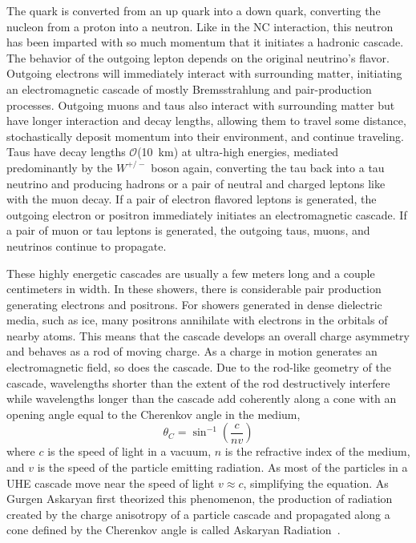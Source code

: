   \noindent The quark is converted from an up quark into a down quark, converting the nucleon from a proton into a neutron. 
  Like in the NC interaction, this neutron has been imparted with so much momentum that it initiates a hadronic cascade. 
  The behavior of the outgoing lepton depends on the original neutrino's flavor. 
  Outgoing electrons will immediately interact with surrounding matter, initiating an electromagnetic cascade of mostly Bremsstrahlung and pair-production processes. 
  Outgoing muons and taus also interact with surrounding matter but have longer interaction and decay lengths, allowing them to travel some distance, stochastically deposit momentum into their environment, and continue traveling. 
  Taus have decay lengths $\mathcal{O}$(10~km) at ultra-high energies, mediated predominantly by the $W^{+/-}$ boson again, converting the tau back into a tau neutrino and producing hadrons or a pair of neutral and charged leptons like with the muon decay.
  If a pair of electron flavored leptons is generated, the outgoing electron or positron immediately initiates an electromagnetic cascade. 
  If a pair of muon or tau leptons is generated, the outgoing taus, muons, and neutrinos continue to propagate.

  These highly energetic cascades are usually a few meters long and a couple centimeters in width. 
  In these showers, there is considerable pair production generating electrons and positrons. 
  For showers generated in dense dielectric media, such as ice, many positrons annihilate with electrons in the orbitals of nearby atoms. 
  This means that the cascade develops an overall charge asymmetry and behaves as a rod of moving charge. 
  As a charge in motion generates an electromagnetic field, so does the cascade.
  Due to the rod-like geometry of the cascade, wavelengths shorter than the extent of the rod destructively interfere while wavelengths longer than the cascade add coherently along a cone with an opening angle equal to the Cherenkov angle in the medium, 
  \begin{equation}
    \theta_C = \sin^{-1}(\frac{c}{nv})
    \label{eq:cherenkovangle}
  \end{equation}
  where $c$ is the speed of light in a vacuum, $n$ is the refractive index of the medium, and $v$ is the speed of the particle emitting radiation.
  As most of the particles in a UHE cascade move near the speed of light $v\approx c$, simplifying the equation.
  As Gurgen Askaryan first theorized this phenomenon, the production of radiation created by the charge anisotropy of a particle cascade and propagated along a cone defined by the Cherenkov angle is called Askaryan Radiation~\citep{Askaryan_1961, Askaryan_1965}. 

